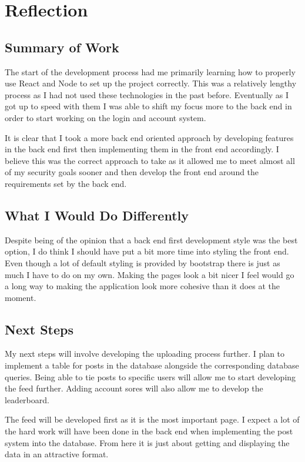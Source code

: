 \documentclass[]{final_report}
\begin{document}
\chapter{Reflection}

\section{Summary of Work}

The start of the development process had me primarily learning how to properly use React and Node to set up the project correctly. This was a relatively lengthy process as I had not used these technologies in the past before. Eventually as I got up to speed with them I was able to shift my focus more to the back end in order to start working on the login and account system. 

It is clear that I took a more back end oriented approach by developing features in the back end first then implementing them in the front end accordingly. I believe this was the correct approach to take as it allowed me to meet almost all of my security goals sooner and then develop the front end around the requirements set by the back end.

\section{What I Would Do Differently}

Despite being of the opinion that a back end first development style was the best option, I do think I should have put a bit more time into styling the front end. Even though a lot of default styling is provided by bootstrap there is just as much I have to do on my own. Making the pages look a bit nicer I feel would go a long way to making the application look more cohesive than it does at the moment.

\section{Next Steps}

My next steps will involve developing the uploading process further. I plan to implement a table for posts in the database alongside the corresponding database queries. Being able to tie posts to specific users will allow me to start developing the feed further. Adding account sores will also allow me to develop the leaderboard. 

The feed will be developed first as it is the most important page. I expect a lot of the hard work will have been done in the back end when implementing the post system into the database. From here it is just about getting and displaying the data in an attractive format.
\end{document}
